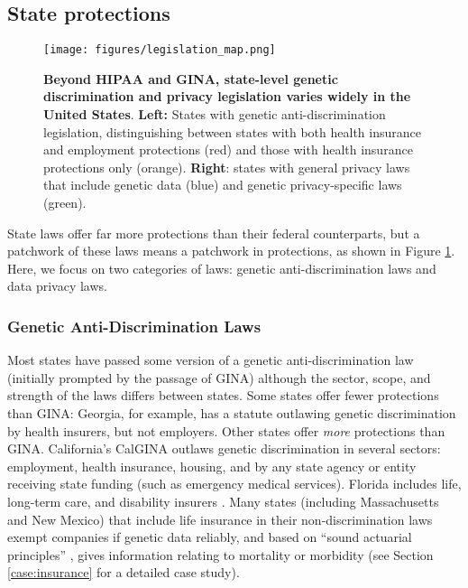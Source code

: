 \subsection{State protections}

\begin{figure}[ht]
    \centering
    \texttt{[image: figures/legislation\_map.png]}
    \caption{\textbf{Beyond HIPAA and GINA, state-level genetic discrimination and privacy legislation varies widely in the United States}. \textbf{Left:} States with genetic anti-discrimination legislation, distinguishing between states with both health insurance and employment protections (red) and those with health insurance protections only (orange). \textbf{Right}: states with general privacy laws that include genetic data (blue) and genetic privacy-specific laws (green).}
    \label{fig:genetic_legislation}
\end{figure}

State laws offer far more protections than their federal counterparts, but a patchwork of these laws means a patchwork in protections, as shown in Figure \ref{fig:genetic_legislation}. Here, we focus on two categories of laws: genetic anti-discrimination laws and data privacy laws.

\subsubsection{Genetic Anti-Discrimination Laws}
Most states have passed some version of a genetic anti-discrimination law (initially prompted by the passage of GINA) although the sector, scope, and strength of the laws differs between states. 
Some states offer fewer protections than GINA: Georgia, for example, has a statute outlawing genetic discrimination by health insurers, but not employers. Other states offer \textit{more} protections than GINA. California's CalGINA \cite{california_senate_bill_559_2011} outlaws genetic discrimination in several sectors: employment, health insurance, housing, and by any state agency or entity receiving state funding (such as emergency medical services). Florida includes life, long-term care, and disability insurers \cite{florida_house_bill_1189_2020}. Many states (including Massachusetts and New Mexico) that include life insurance in their non-discrimination laws exempt companies if genetic data reliably, and based on ``sound actuarial principles'' \cite{massachusetts_genetic_law_2025}, gives information relating to mortality or morbidity (see Section \ref{case:insurance} for a detailed case study).

